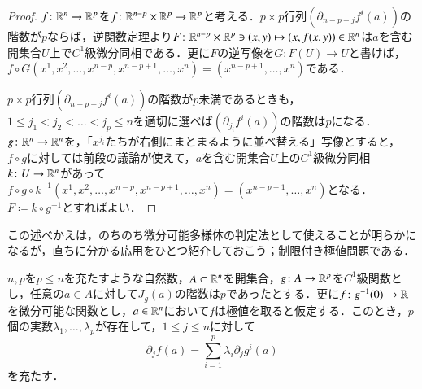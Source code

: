 \begin{proof}
$f \colon \mathbb{R}^n \to \mathbb{R}^p$を$f \colon \mathbb{R}^{n-p} \times \mathbb{R}^p \to \mathbb{R}^p$と考える．$p \times p$行列$(\partial_{n-p+j}f^i (a))$の階数が$p$ならば，逆関数定理より$F \colon \mathbb{R}^{n-p} \times \mathbb{R}^p \ni (x,y) \mapsto (x,f(x,y)) \in \mathbb{R}^n$は$a$を含む開集合$U$上で$C^1$級微分同相である．更に$F$の逆写像を$G \colon F(U) \to U$と書けば，$f\circ G(x^1,x^2, \dots, x^{n-p}, x^{n-p+1}, \dots, x^n) = (x^{n-p+1}, \dots, x^n)$である．

$p \times p$行列$(\partial_{n-p+j}f^i (a))$の階数が$p$未満であるときも，$1 \leq j_1 < j_2 < \dots < j_p \leq n$を適切に選べば$(\partial_{j_i} f^i(a))$の階数は$p$になる．$g \colon \mathbb{R}^n \to \mathbb{R}^n$を，「$x^{j_i}$たちが右側にまとまるように並べ替える」写像とすると，$f \circ g$に対しては前段の議論が使えて，$a$を含む開集合$U$上の$C^1$級微分同相$k \colon U \to \mathbb{R}^n$があって$f \circ g \circ k^{-1}(x^1,x^2, \dots, x^{n-p}, x^{n-p+1}, \dots, x^n) = (x^{n-p+1}, \dots, x^n)$となる．$F \coloneqq k \circ g^{-1}$とすればよい．
\end{proof}

この述べかえは，のちのち微分可能多様体の判定法として使えることが明らかになるが，直ちに分かる応用をひとつ紹介しておこう；制限付き極値問題である．

\begin{prop}
$n,p$を$p \leq n$を充たすような自然数，$A \subset \mathbb{R}^n$を開集合，$g \colon A \to \mathbb{R}^p$を$C^1$級関数とし，任意の$a \in A$に対して$J_g(a)$の階数は$p$であったとする．更に$f \colon g^{-1}(0) \to \mathbb{R}$を微分可能な関数とし，$a \in \mathbb{R}^n$において$f$は極値を取ると仮定する．このとき，$p$個の実数$\lambda_1, \dots, \lambda_p$が存在して，$1 \leq j \leq n$に対して
\begin{equation}
\partial_j f(a) = \sum_{i=1}^p \lambda_i \partial_j g^i(a)
\end{equation}を充たす．
\end{prop}

